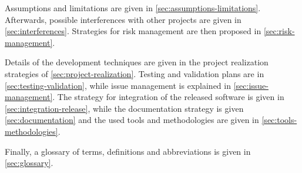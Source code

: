 Assumptions and limitations are given in \autoref{sec:assumptions-limitations}.
Afterwards, possible interferences with other projects are given in \autoref{sec:interferences}.
Strategies for risk management are then proposed in \autoref{sec:risk-management}.

Details of the development techniques are given in the project realization strategies of \autoref{sec:project-realization}.
Testing and validation plans are in \autoref{sec:testing-validation}, while issue management is explained in \autoref{sec:issue-management}.
The strategy for integration of the released software is given in \autoref{sec:integration-release}, while the documentation strategy is given \autoref{sec:documentation} and the used tools and methodologies are given in \autoref{sec:tools-methodologies}.

Finally, a glossary of terms, definitions and abbreviations is given in \autoref{sec:glossary}.

